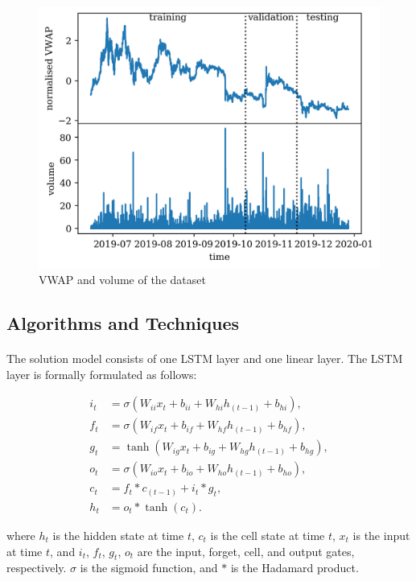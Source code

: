 \documentclass[12pt, letterpaper]{article}
\begin{document}
\begin{figure}
    \centering
    \includegraphics[width=\textwidth]{figures/dataset.png}
    \caption{VWAP and volume of the dataset}%
    \label{fig:dataset}
\end{figure}

\subsection{Algorithms and Techniques}

\paragraph{}
The solution model consists of one LSTM layer and one linear layer. The LSTM layer is formally formulated as follows:

\begin{align*}
    i_t & =\sigma\left(W_{ii}x_t+b_{ii}+W_{hi}h_{(t-1)}+b_{hi}\right), \\
    f_t & =\sigma\left(W_{if}x_t+b_{if}+W_{hf}h_{(t-1)}+b_{hf}\right), \\
    g_t & =\tanh\left(W_{ig}x_t+b_{ig}+W_{hg}h_{(t-1)}+b_{hg}\right), \\
    o_t & =\sigma\left(W_{io}x_t+b_{io}+W_{ho}h_{(t-1)}+b_{ho}\right), \\
    c_t & =f_t*c_{(t-1)}+i_t*g_t, \\
    h_t & =o_t*\tanh(c_t).
\end{align*}

where \(h_t\) is the hidden state at time \(t\), \(c_t\) is the cell state at time \(t\), \(x_t\) is the input at time \(t\), and \(i_t\), \(f_t\), \(g_t\), \(o_t\) are the input, forget, cell, and output gates, respectively. \(\sigma \) is the sigmoid function, and \(*\) is the Hadamard product.
\end{document}
